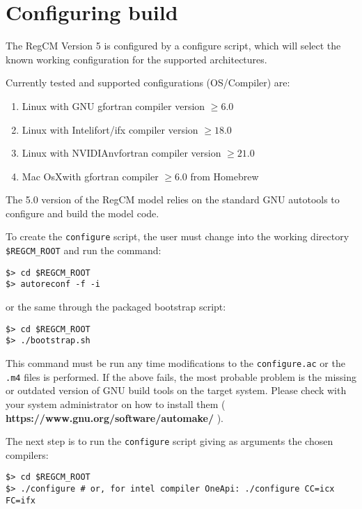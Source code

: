 \section{Configuring build}

The RegCM Version 5 is configured by a configure script, which will select
the known working configuration for the supported architectures.

Currently tested and supported configurations (OS/Compiler) are:

\begin{enumerate}
\item Linux with GNU gfortran compiler version $\ge 6.0$
\item Linux with Intel\texttrademark ifort/ifx compiler version $\ge 18.0$
\item Linux with NVIDIA\texttrademark nvfortran compiler version $\ge 21.0$
\item Mac OsX\texttrademark with gfortran compiler $\ge 6.0$ from Homebrew
\end{enumerate}

The 5.0 version of the RegCM model relies on the standard GNU autotools to
configure and build the model code.

To create the \verb=configure= script, the user must change into the 
working directory \verb=$REGCM_ROOT= and run the command:

\begin{Verbatim}
$> cd $REGCM_ROOT
$> autoreconf -f -i
\end{Verbatim}

or the same through the packaged bootstrap script:

\begin{Verbatim}
$> cd $REGCM_ROOT
$> ./bootstrap.sh
\end{Verbatim}

This command must be run any time modifications to the \verb=configure.ac= or
the \verb=.m4= files is performed.
If the above fails, the most probable problem is the missing or outdated
version of GNU build tools on the target system. Please check with your
system administrator on how to install them
({ \bf https://www.gnu.org/software/automake/ }).

The next step is to run the \verb=configure= script giving as arguments the
chosen compilers:

\begin{Verbatim}
$> cd $REGCM_ROOT
$> ./configure # or, for intel compiler OneApi: ./configure CC=icx FC=ifx
\end{Verbatim}

